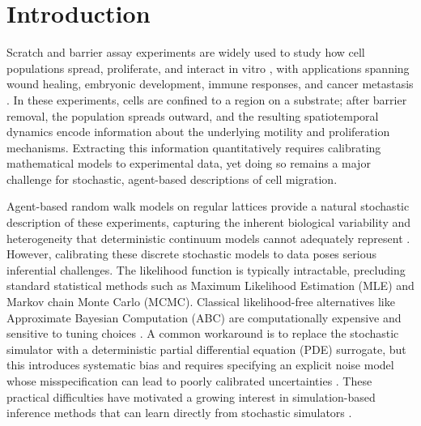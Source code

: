 \documentclass{article}
\begin{document}
\section{Introduction}

Scratch and barrier assay experiments are widely used to study how cell populations spread, proliferate, and interact in vitro \citep{Jin2016ScratchRepro,Johnston2014LeadingEdgeInfo,Simpson2013CircularBarrier}, with applications spanning wound healing, embryonic development, immune responses, and cancer metastasis \citep{Friedl2009,Rorth2009}. In these experiments, cells are confined to a region on a substrate; after barrier removal, the population spreads outward, and the resulting spatiotemporal dynamics encode information about the underlying motility and proliferation mechanisms. Extracting this information quantitatively requires calibrating mathematical models to experimental data, yet doing so remains a major challenge for stochastic, agent-based descriptions of cell migration.

Agent-based random walk models on regular lattices provide a natural stochastic description of these experiments, capturing the inherent biological variability and heterogeneity that deterministic continuum models cannot adequately represent \citep{Codling2008,Simpson2025.05.25.656057,Plank2025}. However, calibrating these discrete stochastic models to data poses serious inferential challenges. The likelihood function is typically intractable, precluding standard statistical methods such as Maximum Likelihood Estimation (MLE) and Markov chain Monte Carlo (MCMC). Classical likelihood-free alternatives like Approximate Bayesian Computation (ABC) are computationally expensive and sensitive to tuning choices \citep{SunnkerABC,Sisson2018}. A common workaround is to replace the stochastic simulator with a deterministic partial differential equation (PDE) surrogate, but this introduces systematic bias and requires specifying an explicit noise model whose misspecification can lead to poorly calibrated uncertainties \citep{KennedyOHagan2001,BrynjarsdottirOHagan2014,SIMPSON2024111732}. These practical difficulties have motivated a growing interest in simulation-based inference methods that can learn directly from stochastic simulators \citep{Carr2021,SIMPSON2022111201,Simpson2025.05.25.656057,Ross2017ABCadhesion,Warne2022RapidBayes,Liu2024PRE}.
\end{document}
